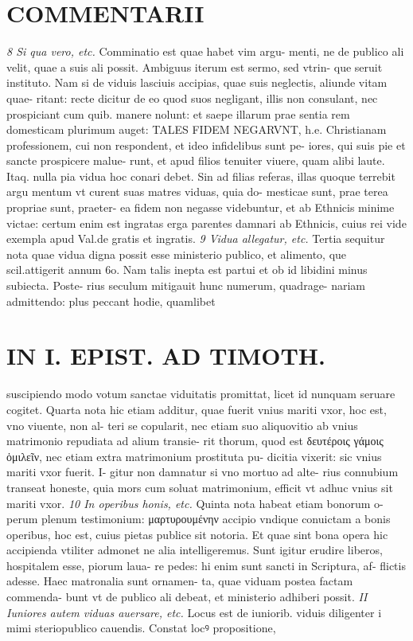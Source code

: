 \documentclass{article}
\begin{document}
\begin{pages}
\section*{COMMENTARII }
\marginpar{[ p.126 ]}
\textit{8 Si qua vero, etc. }\pstart Comminatio est quae habet vim argu- menti, ne de publico ali velit, quae a suis ali possit. Ambiguus iterum est sermo, sed vtrin- que seruit instituto. Nam si de viduis lasciuis accipias, quae suis neglectis, aliunde vitam quae- ritant: recte dicitur de eo quod suos negligant, illis non consulant, nec prospiciant cum quib. manere nolunt: et saepe illarum prae sentia rem domesticam plurimum auget: TALES FIDEM NEGARVNT, h.e. Christianam professionem, cui non respondent, et ideo infidelibus sunt pe- iores, qui suis pie et sancte prospicere malue- runt, et apud filios tenuiter viuere, quam alibi laute. Itaq. nulla pia vidua hoc conari debet. Sin ad filias referas, illas quoque terrebit argu mentum vt curent suas matres viduas, quia do- mesticae sunt, prae terea propriae sunt, praeter- ea fidem non negasse videbuntur, et ab Ethnicis minime victae: certum enim est ingratas erga parentes damnari ab Ethnicis, cuius rei vide exempla apud Val.de gratis et ingratis.  \pend
\textit{9 Vidua allegatur, etc. }\pstart Tertia sequitur nota quae vidua digna possit esse ministerio publico, et alimento, que scil.attigerit annum 6o. Nam talis inepta est partui et ob id libidini minus subiecta. Poste- rius seculum mitigauit hunc numerum, quadrage- nariam admittendo: plus peccant hodie, quamlibet  \pend
\section*{IN I. EPIST. AD TIMOTH. }
\marginpar{[ p.127 ]}\pstart suscipiendo modo votum sanctae viduitatis promittat, licet id nunquam seruare cogitet.  \pend\pstart Quarta nota hic etiam additur, quae fuerit vnius mariti vxor, hoc est, vno viuente, non al- teri se copularit, nec etiam suo aliquovitio ab vnius matrimonio repudiata ad alium transie- rit thorum, quod est δευτέροις γάμοις ὁμιλεῖν, nec etiam extra matrimonium prostituta pu- dicitia vixerit: sic vnius mariti vxor fuerit. I- gitur non damnatur si vno mortuo ad alte- rius connubium transeat honeste, quia mors cum soluat matrimonium, efficit vt adhuc vnius sit mariti vxor.  \pend
\textit{10 In operibus honis, etc. }\pstart Quinta nota habeat etiam bonorum o- perum plenum testimonium: μαρτυρουμένην accipio vndique conuictam a bonis operibus, hoc est, cuius pietas publice sit notoria. Et quae sint bona opera hic accipienda vtiliter admonet ne alia intelligeremus. Sunt igitur erudire liberos, hospitalem esse, piorum laua- re pedes: hi enim sunt sancti in Scriptura, af- flictis adesse. Haec matronalia sunt ornamen- ta, quae viduam postea factam commenda- bunt vt de publico ali debeat, et ministerio adhiberi possit.  \pend
\textit{II Iuniores autem viduas auersare, etc. }\pstart Locus est de iuniorib. viduis diligenter i mimi steriopublico cauendis. Constat locꝰ propositione,  \pend

\end{pages}
\end{document}
